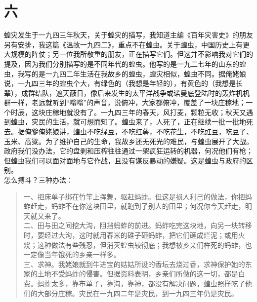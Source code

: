\fancyhead[RO]{\thepage} %
\fancyhead[LE]{\thepage} %
\fancyfoot[LE,RO]{}
\fancyfoot[LO,CE]{}
\fancyfoot[CO,RE]{}
\chapter*{六}
蝗灾发生于一九四三年秋天，关于蝗灾的描写，我知道主编《百年灾害史》的朋友另有安排，我这篇《温故一九四二》，重点不在蝗虫。关于蝗虫，中国历史上有更大规模的阵仗；另一位我所敬重的朋友，正在描写它们。但这并不影响我对它们的提及，因为我们分别描写的是不同年代的蝗虫。他写的是一九二七年的山东的蝗虫，我写的是一九四二年生活在我故乡的蝗虫，蝗灾相似，蝗虫不同。据俺姥娘说，一九四三年的蝗虫个大，有绿色的（我想是年轻的），有黄色的（我想是长辈），成群结队，遮天蔽日，像后来发生的太平洋战争或诺曼底登陆时的轰炸机机群一样，老远就听到“嗡嗡”的声音，说俯冲，大家都俯冲，覆盖了一块庄稼地；一个时辰，这块庄稼地就没有了。一九四三年的春天，风打麦，颗粒无收；秋天又遇到蝗虫，灾民的生活，就可想而知了。蝗虫来了，人死了，正在继续一批一批地死去。据俺爹俺姥娘讲，蝗虫不吃绿豆，不吃红薯，不吃花生，不吃豇豆，吃豆子、玉米、高粱。为了维护自己的生命，我故乡还无死光的难民，与蝗虫展开了大战。政府我们没办法，它的盘剥和压榨往往通过一架疯狂运转的机器，何况他们有枪；但蝗虫我们可以面对面地与它作战，且没有谋反暴动的嫌疑。这是蝗虫与政府的区别。\\

怎么搏斗？三种办法：\\

\begin{quote}
	一、把床单子绑在竹竿上挥舞，驱赶蚂蚱。但这是损人利己的做法，你把蚂蚱赶走，蚂蚱不在你这块田里，就跑到了别人的田里；何况你今天赶走，明天就又来了。\\

二、田与田之间挖大沟，阻挡蚂蚱的前进。蚂蚱吃完这块地，向另一块转移时，要经过大沟，这时就用舂米的碓子砸蚂蚱，把它们砸成烂泥；或用火烧；这种做法有些残忍，但消灭蝗虫较彻底；我想被乡亲们杵死的蚂蚱，也一定像当年饿死的乡亲一样多。\\

三、求神。我姥娘就到牛进宝的姑姑所设的香坛去烧过香，求神保护她的东家的土地不受蚂蚱的侵害。但据资料表明，乡亲们所做的这一切，都是白费。蚂蚱太多，靠布单子，靠沟，靠神，都没有解决问题，蝗虫照样吃了他们的大部分庄稼。灾民在一九四二年是灾民，到一九四三年仍是灾民。\\
\end{quote}

